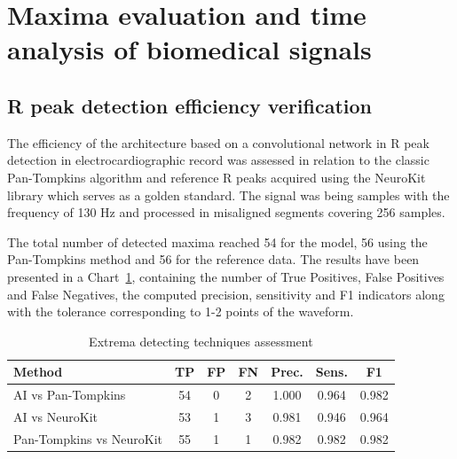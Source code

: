 \documentclass[journal]{IEEEtran}
\begin{document}
\newpage
\section{Maxima evaluation and time analysis of biomedical signals}
\subsection{R peak detection efficiency verification}
The efficiency of the architecture based on a convolutional network in R peak detection in electrocardiographic record was assessed in relation to the classic Pan-Tompkins algorithm and reference R peaks acquired using the NeuroKit library which serves as a golden standard. The signal was being samples with the frequency of 130 Hz and processed in misaligned segments covering 256 samples.

The total number of detected maxima reached 54 for the model, 56 using the Pan-Tompkins method and 56 for the reference data. The results have been presented in a Chart~\ref{tab:peak_comparison}, containing the number of True Positives, False Positives and False Negatives, the computed precision, sensitivity and F1 indicators along with the tolerance corresponding to 1-2 points of the waveform.

\begin{table}[ht]
\caption{Extrema detecting techniques assessment}
\label{tab:peak_comparison}
\centering
\begin{tabular}{|p{3.08cm}|c|c|c|c|c|c|}
\hline
\textbf{Method} & \textbf{TP} & \textbf{FP} & \textbf{FN} & \textbf{Prec.} & \textbf{Sens.} & \textbf{F1} \\
\hline
AI vs Pan-Tompkins & 54 & 0 & 2 & 1.000 & 0.964 & 0.982 \\
AI vs NeuroKit & 53 & 1 & 3 & 0.981 & 0.946 & 0.964 \\
Pan-Tompkins vs NeuroKit & 55 & 1 & 1 & 0.982 & 0.982 & 0.982 \\
\hline
\end{tabular}
\end{table}
\end{document}
